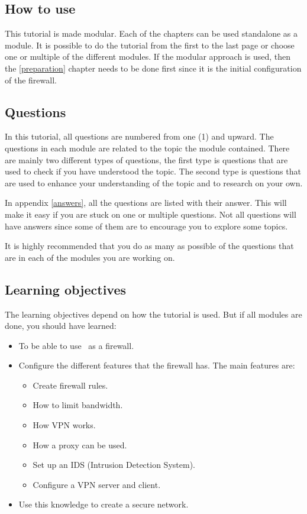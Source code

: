 \subsection*{How to use}
This tutorial is made modular. Each of the chapters can be used standalone as a module. It is possible to do the tutorial from the first to the last page or choose one or multiple of the different modules. If the modular approach is used, then the \ref{preparation} chapter needs to be done first since it is the initial configuration of the firewall.

\subsection*{Questions}
In this tutorial, all questions are numbered from one (1) and upward. The questions in each module are related to the topic the module contained. There are mainly two different types of questions, the first type is questions that are used to check if you have understood the topic. The second type is questions that are used to enhance your understanding of the topic and to research on your own.

In appendix \ref{answers}, all the questions are listed with their answer. This will make it easy if you are stuck on one or multiple questions. Not all questions will have answers since some of them are to encourage you to explore some topics.

It is highly recommended that you do as many as possible of the questions that are in each of the modules you are working on.

\subsection*{Learning objectives}
The learning objectives depend on how the tutorial is used. But if all modules are done, you should have learned:
\begin{itemize}
    \item To be able to use \opnsense\ as a firewall.
    \item Configure the different features that the firewall has. The main features are:
    \begin{itemize}
        \item Create firewall rules.
        \item How to limit bandwidth.
        \item How VPN works.
        \item How a proxy can be used.
        \item Set up an IDS (Intrusion Detection System).
        \item Configure a VPN server and client.
    \end{itemize}
    \item Use this knowledge to create a secure network.
\end{itemize}

